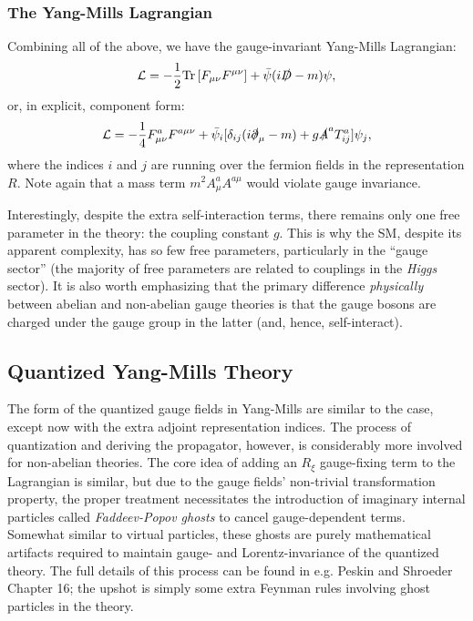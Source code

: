 \subsubsection{The Yang-Mills Lagrangian}

Combining all of the above, we have the gauge-invariant Yang-Mills Lagrangian:
\begin{equation}
	\label{eq:01_qft_gt_yangmills_lagrangian}
	\mathcal L = -\frac{1}{2}\mathrm{Tr}\left[F_{\mu\nu}F^{\mu\nu}\right] + \bar\psi(i\slashed D - m)\psi,
\end{equation}
or, in explicit, component form:
\begin{equation}
	\label{eq:01_qft_gt_yangmills_lagrangian_explicit}
	\mathcal L = -\frac{1}{4}F_{\mu\nu}^aF^{a\mu\nu} + \bar\psi_i[\delta_{ij}(i\slashed \partial_\mu - m) + g\slashed A^aT_{ij}^a]\psi_j,
\end{equation}
where the indices $i$ and $j$ are running over the fermion fields in the representation $R$.
Note again that a mass term $m^2A_\mu^aA^{a\mu}$ would violate gauge invariance.

Interestingly, despite the extra self-interaction terms, there remains only one free parameter in the theory: the coupling constant $g$.
This is why the SM, despite its apparent complexity, has so few free parameters, particularly in the ``gauge sector'' (the majority of free parameters are related to couplings in the \textit{Higgs} sector).
It is also worth emphasizing that the primary difference \textit{physically} between abelian and non-abelian gauge theories is that the gauge bosons are charged under the gauge group in the latter (and, hence, self-interact).



\subsection{Quantized Yang-Mills Theory}
\label{sec:01_qft_gt_ymquant}

The form of the quantized gauge fields in Yang-Mills are similar to the \UU[1] case, except now with the extra adjoint representation indices.
The process of quantization and deriving the propagator, however, is considerably more involved for non-abelian theories.
The core idea of adding an $R_\xi$ gauge-fixing term to the Lagrangian is similar, but due to the gauge fields' non-trivial transformation property, the proper treatment necessitates the introduction of imaginary internal particles called \textit{Faddeev-Popov ghosts} to cancel gauge-dependent terms.
Somewhat similar to virtual particles, these ghosts are purely mathematical artifacts required to maintain gauge- and Lorentz-invariance of the quantized theory.
The full details of this process can be found in e.g. Peskin and Shroeder~\cite{Peskin:1995ev} Chapter 16; the upshot is simply some extra Feynman rules involving ghost particles in the theory.

